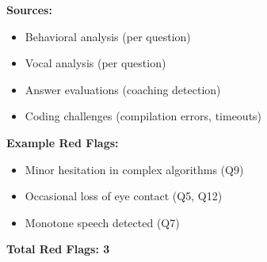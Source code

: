 \documentclass[12pt,a4paper]{article}
\begin{document}
\newpage

\begin{tcolorbox}[colback=lightgray,colframe=black,title=\textbf{STEP 5: Aggregate Red Flags}]
\textbf{Sources:}
\begin{itemize}
    \item Behavioral analysis (per question)
    \item Vocal analysis (per question)
    \item Answer evaluations (coaching detection)
    \item Coding challenges (compilation errors, timeouts)
\end{itemize}

\textbf{Example Red Flags:}
\begin{itemize}
    \item Minor hesitation in complex algorithms (Q9)
    \item Occasional loss of eye contact (Q5, Q12)
    \item Monotone speech detected (Q7)
\end{itemize}

\textbf{Total Red Flags: 3}
\end{tcolorbox}

\vspace{0.5cm}
\end{document}
